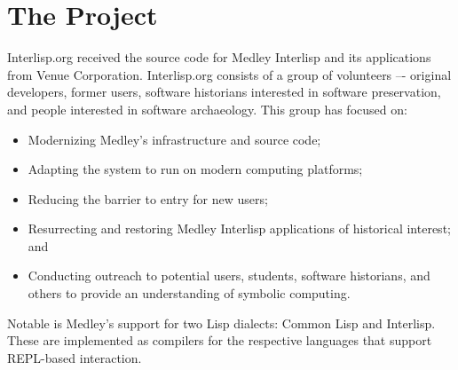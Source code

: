 \documentclass[sigconf]{acmart}
\begin{document}
\section{The Project}

Interlisp.org received the source code for Medley Interlisp and its applications from Venue Corporation. Interlisp.org consists of a group of volunteers –- original developers, former users, software historians interested in software preservation, and people interested in software archaeology. This group has focused on:

\begin{itemize}
  \item Modernizing Medley's infrastructure and source code;

  \item Adapting the system to run on modern computing platforms;

  \item Reducing the barrier to entry for new users; 

  \item Resurrecting and restoring Medley Interlisp applications of historical interest; and

  \item Conducting outreach to potential users, students, software historians, and others to provide an understanding of symbolic computing.
\end{itemize}

Notable is Medley's support for two Lisp dialects: Common Lisp and Interlisp. These are implemented as compilers for the respective languages that support REPL-based interaction.







\end{document}
